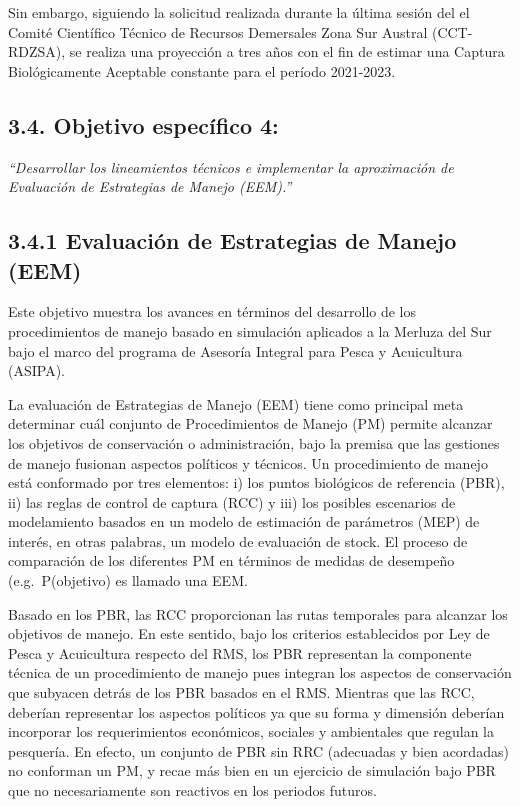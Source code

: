 \documentclass[
  spanish,
]{article}
\begin{document}
Sin embargo, siguiendo la solicitud realizada durante la última sesión
del el Comité Científico Técnico de Recursos Demersales Zona Sur Austral
(CCT-RDZSA), se realiza una proyección a tres años con el fin de estimar
una Captura Biológicamente Aceptable constante para el período
2021-2023.

\hypertarget{objetivo-especuxedfico-4}{%
\subsection{3.4. Objetivo específico
4:}\label{objetivo-especuxedfico-4}}

\emph{``Desarrollar los lineamientos técnicos e implementar la
aproximación de Evaluación de Estrategias de Manejo (EEM).''}

\hypertarget{evaluaciuxf3n-de-estrategias-de-manejo-eem}{%
\subsection{3.4.1 Evaluación de Estrategias de Manejo
(EEM)}\label{evaluaciuxf3n-de-estrategias-de-manejo-eem}}

Este objetivo muestra los avances en términos del desarrollo de los
procedimientos de manejo basado en simulación aplicados a la Merluza del
Sur bajo el marco del programa de Asesoría Integral para Pesca y
Acuicultura (ASIPA).

La evaluación de Estrategias de Manejo (EEM) tiene como principal meta
determinar cuál conjunto de Procedimientos de Manejo (PM) permite
alcanzar los objetivos de conservación o administración, bajo la premisa
que las gestiones de manejo fusionan aspectos políticos y técnicos. Un
procedimiento de manejo está conformado por tres elementos: i) los
puntos biológicos de referencia (PBR), ii) las reglas de control de
captura (RCC) y iii) los posibles escenarios de modelamiento basados en
un modelo de estimación de parámetros (MEP) de interés, en otras
palabras, un modelo de evaluación de stock. El proceso de comparación de
los diferentes PM en términos de medidas de desempeño (e.g.~P(objetivo)
es llamado una EEM.

Basado en los PBR, las RCC proporcionan las rutas temporales para
alcanzar los objetivos de manejo. En este sentido, bajo los criterios
establecidos por Ley de Pesca y Acuicultura respecto del RMS, los PBR
representan la componente técnica de un procedimiento de manejo pues
integran los aspectos de conservación que subyacen detrás de los PBR
basados en el RMS. Mientras que las RCC, deberían representar los
aspectos políticos ya que su forma y dimensión deberían incorporar los
requerimientos económicos, sociales y ambientales que regulan la
pesquería. En efecto, un conjunto de PBR sin RRC (adecuadas y bien
acordadas) no conforman un PM, y recae más bien en un ejercicio de
simulación bajo PBR que no necesariamente son reactivos en los periodos
futuros.
\end{document}
